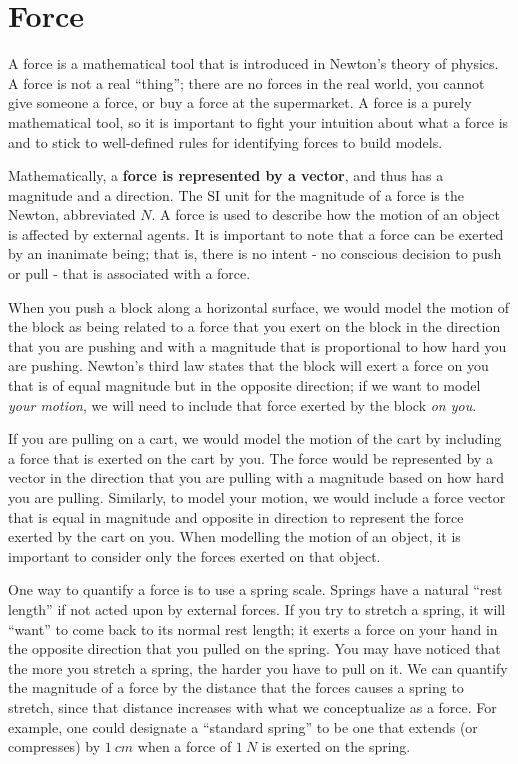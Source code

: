 \section{Force}
A force is a mathematical tool that is introduced in Newton's theory of physics. A force is not a real ``thing''; there are no forces in the real world, you cannot give someone a force, or buy a force at the supermarket. A force is a purely mathematical tool, so it is important to fight your intuition about what a force is and to stick to well-defined rules for identifying forces to build models.

Mathematically, a \textbf{force is represented by a vector}, and thus has a magnitude and a direction. The SI unit for the magnitude of a force is the Newton, abbreviated $\si{N}$. A force is used to describe how the motion of an object is affected by external agents. It is important to note that a force can be exerted by an inanimate being; that is, there is no intent - no conscious decision to push or pull - that is associated with a force.

When you push a block along a horizontal surface, we would model the motion of the block as being related to a force that you exert on the block in the direction that you are pushing and with a magnitude that is proportional to how hard you are pushing. Newton's third law states that the block will exert a force on you that is of equal magnitude but in the opposite direction; if we want to model \textit{your motion}, we will need to include that force exerted by the block \textit{on you}. 

If you are pulling on a cart, we would model the motion of the cart by including a force that is exerted on the cart by you. The force would be represented by a vector in the direction that you are pulling with a magnitude based on how hard you are pulling. Similarly, to model your motion, we would include a force vector that is equal in magnitude and opposite in direction to represent the force exerted by the cart on you. When modelling the motion of an object, it is important to consider only the forces exerted on that object.

One way to quantify a force is to use a spring scale. Springs have a natural ``rest length'' if not acted upon by external forces. If you try to stretch a spring, it will ``want'' to come back to its normal rest length; it exerts a force on your hand in the opposite direction that you pulled on the spring. You may have noticed that the more you stretch a spring, the harder you have to pull on it. We can quantify the magnitude of a force by the distance that the forces causes a spring to stretch, since that distance increases with what we conceptualize as a force. For example, one could designate a ``standard spring'' to be one that extends (or compresses) by $\SI{1}{cm}$ when a force of $\SI{1}{N}$ is exerted on the spring. 

